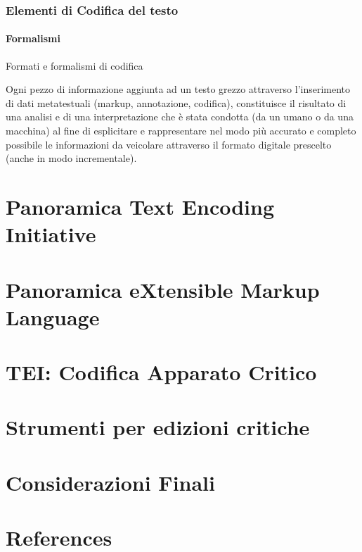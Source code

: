 \documentclass{beamer}
\begin{document}
\begin{frame}
	\frametitle{Elementi di Codifica del testo}
	\framesubtitle{Formalismi}
	\addtocounter{nframe}{1}

	\begin{block}{Formati e formalismi di codifica}

		Ogni pezzo di informazione aggiunta ad un testo grezzo attraverso l'inserimento di dati metatestuali (markup, annotazione, codifica), constituisce il risultato di una analisi e di una interpretazione che è stata condotta (da un umano o da una macchina) al fine di esplicitare e rappresentare nel modo più accurato e completo possibile le informazioni da veicolare attraverso il formato digitale prescelto (anche in modo incrementale).


	\end{block}

\end{frame}

\section{Panoramica Text Encoding Initiative}
%

\section{Panoramica eXtensible Markup Language}
%

\section{TEI: Codifica Apparato Critico}


\section{Strumenti per edizioni critiche}
%

\section{Considerazioni Finali}
%

\section{References}
%
\end{document}
